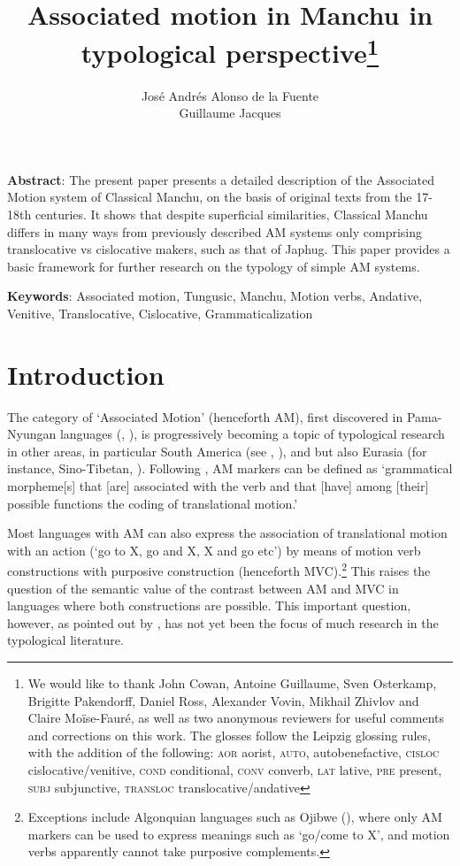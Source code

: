 \documentclass{article}
\begin{document}
 
\title{Associated motion in Manchu in typological perspective\footnote{We would like to thank John Cowan, Antoine Guillaume, Sven Osterkamp, Brigitte Pakendorff, Daniel Ross, Alexander Vovin, Mikhail Zhivlov and Claire Moïse-Fauré, as well as two anonymous reviewers for useful comments and corrections on this work. The glosses follow the Leipzig glossing rules, with the addition of the following: \textsc{aor} aorist, \textsc{auto}, autobenefactive, \textsc{cisloc} cislocative/venitive, \textsc{cond} conditional, \textsc{conv} converb, \textsc{lat} lative,  \textsc{pre} present, \textsc{subj} subjunctive, \textsc{transloc} translocative/andative } }
\author{José Andrés Alonso de la Fuente\\Guillaume Jacques}
\maketitle 

\textbf{Abstract}: The present paper presents a detailed description of the Associated Motion system of Classical Manchu, on the basis of original texts from the 17-18th centuries. It shows that despite superficial similarities, Classical Manchu differs in many ways from previously described AM systems only comprising translocative vs cislocative makers, such as that of Japhug. This paper provides a basic framework for further research on the typology of simple AM systems.

\textbf{Keywords}: Associated motion, Tungusic, Manchu, Motion verbs, Andative, Venitive, Translocative, Cislocative, Grammaticalization

\section*{Introduction}
The category of `Associated Motion' (henceforth AM), first discovered in Pama-Nyungan languages (\citealt{koch84associated.motion}, \citealt{wilkins91associated.motion}), is progressively becoming a topic of typological research in other areas, in particular South America (see \citealt{guillaume08cavinena}, \citealt{guillaume16am}), and but also Eurasia (for instance, Sino-Tibetan, \citealt{jacques13harmonization}). Following \citet[12]{guillaume16am}, AM markers can be defined as `grammatical morpheme[s] that [are] associated with the verb
and that [have] among [their] possible functions the coding of translational
motion.'

Most languages with AM can also express the association of translational motion with an action (`go to X, go and X, X and go etc')  by means of motion verb constructions with purposive construction (henceforth MVC).\footnote{Exceptions include Algonquian languages such as Ojibwe (\citealt[729-733]{valentine01grammar}), where only AM markers can be used to express meanings such as `go/come to X', and motion verbs apparently cannot take purposive complements.} This raises the question of the semantic value of the contrast between AM and MVC in languages where both constructions are possible. This important question, however, as pointed out by \citet[10]{guillaume16am}, has not yet been the focus of much research in the typological literature.
\end{document}

